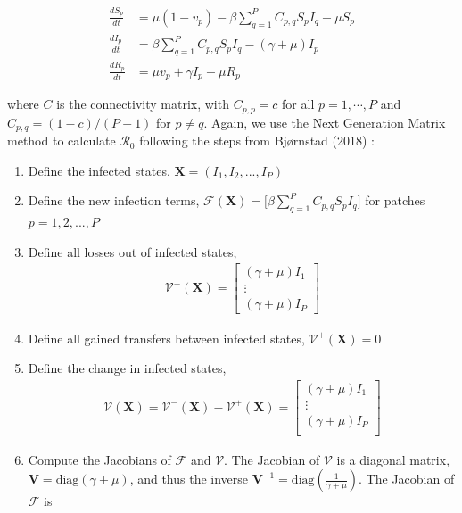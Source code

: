 \documentclass[12pt]{article}
\newcommand{\Rn}{{\mathcal R}_0}
\begin{document}
\begin{align}
    \frac{dS_p}{dt} &= \mu (1-v_p) - \beta \sum_{q=1}^{P} C_{p,q} S_p I_q - \mu S_p \\
    \frac{dI_p}{dt} &= \beta \sum_{q=1}^{P} C_{p,q} S_p I_q - (\gamma + \mu) I_p \\
    \frac{dR_p}{dt} &= \mu v_p + \gamma I_p - \mu R_p
\end{align}

\noindent
where $C$ is the connectivity matrix, with $C_{p,p} = c$ for all $p = 1, \cdots, P$ and $C_{p,q} = (1-c)/(P-1)$ for $p \neq q$. Again, we use the Next Generation Matrix method \citep{DiekmannEtAl1990} to calculate $\Rn$ following the steps from Bj\o{}rnstad (2018) \cite{Bjornstad2018}:
\begin{enumerate}
    \item Define the infected states, $\mathbf{X} = (I_1, I_2, ..., I_P)$
    \item Define the new infection terms, $\mathcal{F}(\mathbf{X}) = \Big[ \beta \sum_{q=1}^{P} C_{p,q} S_p I_q  \Big]$ for patches $p = 1, 2, ..., P$
    \item Define all losses out of infected states, 
    \begin{align*}
        \mathcal{V}^-(\mathbf{X}) = \begin{bmatrix}
        (\gamma + \mu ) I_1 \\
        \vdots \\
        (\gamma + \mu) I_P
        \end{bmatrix}
    \end{align*}

    \item Define all gained transfers between infected states, $\mathcal{V}^+(\mathbf{X}) = 0$
    \item Define the change in infected states,
    \begin{align*}
        \mathcal{V}(\mathbf{X}) = \mathcal{V}^-(\mathbf{X}) - \mathcal{V}^+(\mathbf{X}) = \begin{bmatrix}
        (\gamma + \mu) I_1 \\
        \vdots \\
        (\gamma + \mu) I_P \\
        \end{bmatrix}
    \end{align*}
    \item Compute the Jacobians of $\mathcal{F}$ and $\mathcal{V}$. The Jacobian of $\mathcal{V}$ is a diagonal matrix, $\mathbf{V} = \text{diag}(\gamma + \mu)$, and thus the inverse $\mathbf{V}^{-1} = \text{diag}\left(\frac{1}{\gamma + \mu}\right)$. The Jacobian of $\mathcal{F}$ is


\end{enumerate}
\end{document}
